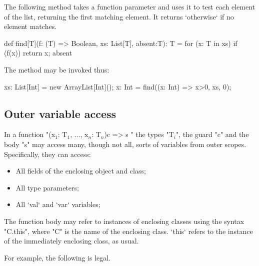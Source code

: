 \begin{example}
The following method takes a function parameter and uses it to
test each element of the list, returning the first matching
element.  It returns \xcd`otherwise` if no element matches.

\begin{xten}

def find[T](f: (T) => Boolean, xs: List[T], absent:T): T = {
  for (x: T in xs)
    if (f(x)) return x;
  absent
  }
\end{xten}

The method may be invoked thus:
\begin{xten}
xs: List[Int] = new ArrayList[Int]();
x: Int = find((x: Int) => x>0, xs, 0);
\end{xten}

\end{example}



\subsection{Outer variable access}

In a function
\xcdmath"(x$_1$: T$_1$, $\dots$, x$_n$: T$_n$){c} => { s }"
the types \xcdmath"T$_i$", the guard \xcd"c" and the body \xcd"s"
may access many, though not all, sorts of variables from outer scopes.  
Specifically, they can access: 
\begin{itemize}
\item All fields of the enclosing object and class;
\item All type parameters;
\item All \xcd`val` and \xcd`var` variables;
\end{itemize}



The function body may refer to instances of enclosing classes using
the syntax \xcd"C.this", where \xcd"C" is the name of the
enclosing class.  \xcd`this` refers to the instance of the immediately
enclosing class, as usual.

For example, the following is legal.  

